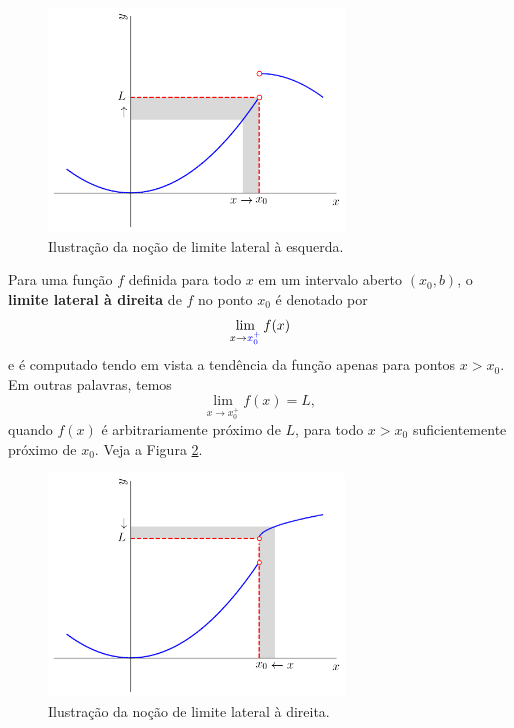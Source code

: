 \begin{figure}[H]
  \centering
  \includegraphics[width=0.7\textwidth]{./cap_lim/dados/fig_lim_esq/fig_lim_esq}
  \caption{Ilustração da noção de limite lateral à esquerda.}
  \label{fig:lim_esq}
\end{figure}

Para uma função $f$ definida para todo $x$ em um intervalo aberto $(x_0, b)$, o {\bf limite lateral à direita} de $f$ no ponto $x_0$ é denotado por
\begin{equation}
  \lim_{x\to {\color{blue}x_0^+}} f(x)
\end{equation}
e é computado tendo em vista a tendência da função apenas para pontos $x>x_0$. Em outras palavras, temos
\begin{equation}
  \lim_{x\to x_0^+} f(x) = L,
\end{equation}
quando $f(x)$ é arbitrariamente próximo de $L$, para todo $x>x_0$ suficientemente próximo de $x_0$. Veja a Figura \ref{fig:lim_dir}.

\begin{figure}[H]
  \centering
  \includegraphics[width=0.7\textwidth]{./cap_lim/dados/fig_lim_dir/fig_lim_dir}
  \caption{Ilustração da noção de limite lateral à direita.}
  \label{fig:lim_dir}
\end{figure}

